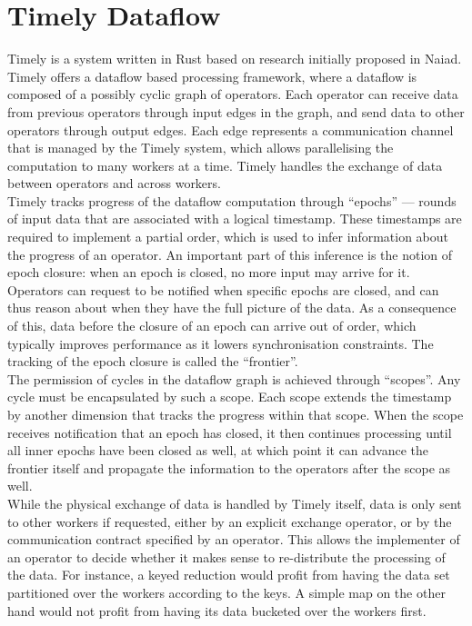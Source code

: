 \section{Timely Dataflow}
Timely\cite{timely} is a system written in Rust based on research initially proposed in Naiad\cite{naiad}. Timely offers a dataflow based processing framework, where a dataflow is composed of a possibly cyclic graph of operators. Each operator can receive data from previous operators through input edges in the graph, and send data to other operators through output edges. Each edge represents a communication channel that is managed by the Timely system, which allows parallelising the computation to many workers at a time. Timely handles the exchange of data between operators and across workers. \\

Timely tracks progress of the dataflow computation through ``epochs'' --- rounds of input data that are associated with a logical timestamp. These timestamps are required to implement a partial order, which is used to infer information about the progress of an operator. An important part of this inference is the notion of epoch closure: when an epoch is closed, no more input may arrive for it. Operators can request to be notified when specific epochs are closed, and can thus reason about when they have the full picture of the data. As a consequence of this, data before the closure of an epoch can arrive out of order, which typically improves performance as it lowers synchronisation constraints. The tracking of the epoch closure is called the ``frontier''. \\

The permission of cycles in the dataflow graph is achieved through ``scopes''. Any cycle must be encapsulated by such a scope. Each scope extends the timestamp by another dimension that tracks the progress within that scope. When the scope receives notification that an epoch has closed, it then continues processing until all inner epochs have been closed as well, at which point it can advance the frontier itself and propagate the information to the operators after the scope as well. \\

While the physical exchange of data is handled by Timely itself, data is only sent to other workers if requested, either by an explicit exchange operator, or by the communication contract specified by an operator. This allows the implementer of an operator to decide whether it makes sense to re-distribute the processing of the data. For instance, a keyed reduction would profit from having the data set partitioned over the workers according to the keys. A simple map on the other hand would not profit from having its data bucketed over the workers first.

